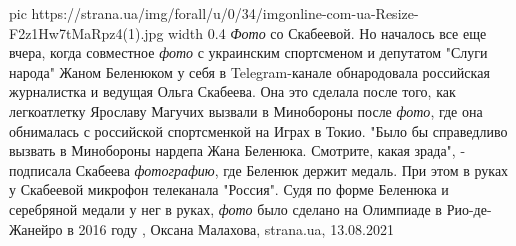 \ifcmt
  pic https://strana.ua/img/forall/u/0/34/imgonline-com-ua-Resize-F2z1Hw7tMaRpz4(1).jpg
  width 0.4
\fi
\emph{Фото} со Скабеевой.  Но началось все еще вчера, когда совместное \emph{фото} с
украинским спортсменом и депутатом "Слуги народа" Жаном Беленюком у себя в
Telegram-канале обнародовала российская журналистка и ведущая Ольга Скабеева.
Она это сделала после того, как легкоатлетку Ярославу Магучих вызвали в
Минобороны после \emph{фото}, где она обнималась с российской спортсменкой на Играх в
Токио.  "Было бы справедливо вызвать в Минобороны нардепа Жана Беленюка.
Смотрите, какая зрада", - подписала Скабеева \emph{фотографию}, где Беленюк держит
медаль. При этом в руках у Скабеевой микрофон телеканала "Россия".  Судя по
форме Беленюка и серебряной медали у нег в руках, \emph{фото} было сделано на
Олимпиаде в Рио-де-Жанейро в 2016 году
, 
Оксана Малахова, strana.ua, 13.08.2021
